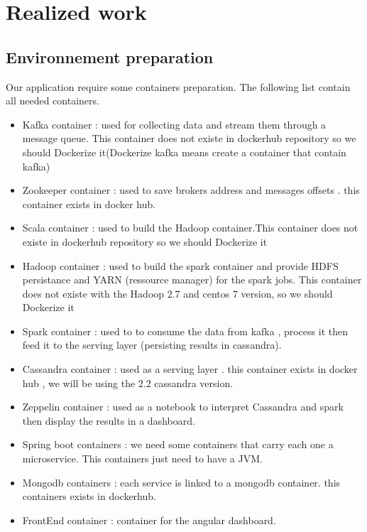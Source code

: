 \section{Realized work}
\label{sec:sec01}
\subsection{Environnement preparation}
\label{sec:sec01}
Our application require some containers preparation. The following list contain all needed containers.
\begin{itemize}
  \item Kafka container : used for collecting data and stream them through a message queue. This container does not existe in dockerhub repository so we should Dockerize it(Dockerize
   kafka means create a container that contain kafka)
  \item Zookeeper container : used to save brokers address and messages offsets . this container exists in docker hub.
  \item Scala container : used to build the Hadoop container.This container does not existe in dockerhub repository so we should Dockerize it
  \item Hadoop container : used to build the spark container and provide HDFS persistance and YARN (ressource manager) for the spark jobs. This container does not existe with
   the Hadoop 2.7 and centos 7 version, so we should Dockerize it
  \item Spark container : used to to consume the data from kafka , process it then feed it to the serving layer (persisting results in cassandra).
  \item Cassandra container : used as a serving layer . this container exists in docker hub , we will be using the 2.2 cassandra version.
  \item Zeppelin container : used as a notebook to interpret Cassandra and spark then display the results in a dashboard.
  \item Spring boot containers : we need some containers that carry each one a microservice. This containers just need to have a JVM.
  \item Mongodb containers : each service is linked to a mongodb container. this containers exists in dockerhub.
  \item FrontEnd container : container for the angular dashboard.
\end{itemize}
